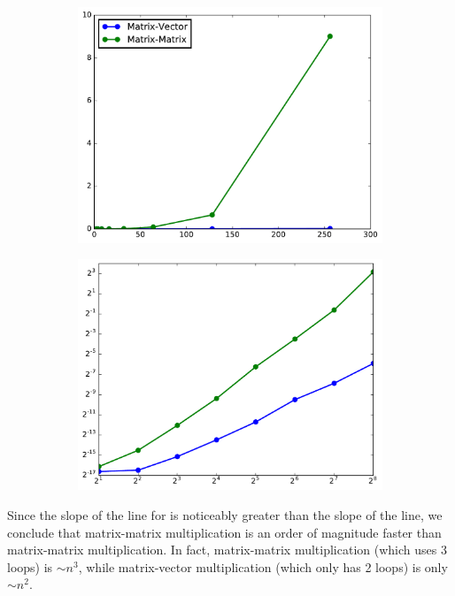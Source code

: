 \begin{figure}[H] %
\captionsetup[subfigure]{justification=centering}
\centering
\begin{subfigure}{.5\textwidth}
    \centering
    \includegraphics[width=\linewidth]{loglogDemoBad.pdf}
\end{subfigure}%
\begin{subfigure}{.5\textwidth}
    \centering
    \includegraphics[width=\linewidth]{loglogDemoGood.pdf}
\end{subfigure}
\caption{ }
\label{fig:loglogdemo}
\end{figure}

Since the slope of the line for  is noticeably greater than the slope of the  line, we conclude that matrix-matrix multiplication is an order of magnitude faster than matrix-matrix multiplication.
In fact, matrix-matrix multiplication (which uses 3  loops) is $\sim n^3$, while matrix-vector multiplication (which only has 2 loops) is only $\sim n^2$.

